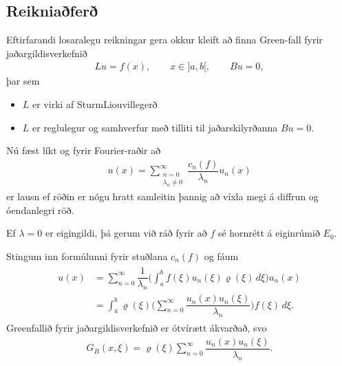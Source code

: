 \documentclass[a4paper,10pt,icelandic]{sphinxmanual}
\begin{document}
\subsection{Reikniaðferð}
\label{\detokenize{Kafli03:reikniafer}}
Eftirfarandi losaralegu reikningar gera okkur kleift að finna Green-fall fyrir jaðargildisverkefnið
\begin{equation*}
\begin{split}Lu=f(x), \qquad x\in ]a,b[, \qquad Bu=0,\end{split}
\end{equation*}
þar sem
\begin{itemize}
\item {} 
\(L\) er virki af Sturm\textendash{}Liouville\textendash{}gerð

\item {} 
\(L\) er reglulegur og samhverfur með tilliti til jaðarskilyrðanna \(Bu=0\).

\end{itemize}

Nú fæst líkt og fyrir Fourier-raðir að
\begin{equation*}
\begin{split}u(x)=\sum\limits_{\substack{n=0 \\ \lambda_n\neq 0}}^{\infty} \dfrac {c_n(f)}{\lambda_n}u_n(x)\end{split}
\end{equation*}
er lausn ef röðin er nógu hratt samleitin þannig að víxla megi á diffrun og óendanlegri röð.

Ef \({\lambda}=0\) er eigingildi, þá gerum við ráð fyrir að \(f\) sé hornrétt á eiginrúmið \(E_0\).

Stingum inn formúlunni fyrir stuðlana \(c_n(f)\) og fáum
\begin{equation*}
\begin{split}\begin{aligned}
 u(x)&= \sum\limits_{n=0}^{\infty} \dfrac 1{\lambda_n}
 \bigg(\int_a^b f({\xi})u_n({\xi}){\varrho}({\xi})\, d{\xi}\bigg)
 u_n(x)\\
 &=\int_a^b{\varrho}({\xi})\bigg(\sum\limits_{n=0}^{\infty} \dfrac{u_n(x)u_n({\xi})}
 {\lambda_n}\bigg) f({\xi})\, d{\xi}.\nonumber\end{aligned}\end{split}
\end{equation*}
Green\textendash{}fallið fyrir jaðargildisverkefnið er ótvírætt ákvarðað, svo
\begin{equation*}
\begin{split}G_B(x,{\xi})={\varrho}({\xi})\sum\limits_{n=0}^{\infty}
 \dfrac{u_n(x)u_n({\xi})}{\lambda_n}.\end{split}
\end{equation*}
\end{document}
